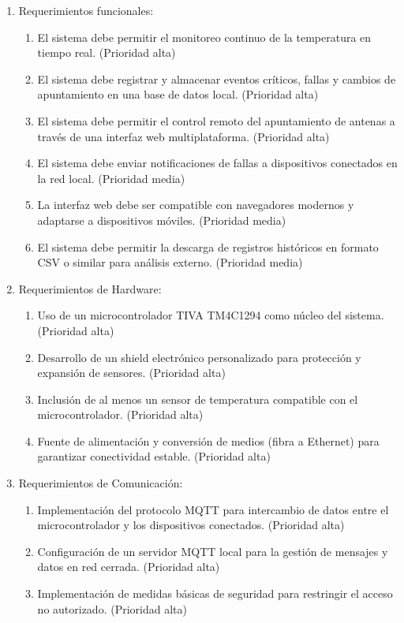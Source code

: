 \documentclass[
11pt, %
]{charter}
\begin{document}
\begin{enumerate}
	\item Requerimientos funcionales:
	\begin{enumerate}
		\item El sistema debe permitir el monitoreo continuo de la temperatura en tiempo real. (Prioridad alta)
		\item El sistema debe registrar y almacenar eventos críticos, fallas y cambios de apuntamiento en una base de datos local. (Prioridad alta)
		\item El sistema debe permitir el control remoto del apuntamiento de antenas a través de una interfaz web multiplataforma. (Prioridad alta)
		\item El sistema debe enviar notificaciones de fallas a dispositivos conectados en la red local. (Prioridad media)
		\item La interfaz web debe ser compatible con navegadores modernos y adaptarse a dispositivos móviles. (Prioridad media)
		\item El sistema debe permitir la descarga de registros históricos en formato CSV o similar para análisis externo. (Prioridad media)
	\end{enumerate}
	\item Requerimientos de Hardware:
	\begin{enumerate}
		\item Uso de un microcontrolador TIVA TM4C1294 como núcleo del sistema. (Prioridad alta)
		\item Desarrollo de un shield electrónico personalizado para protección y expansión de sensores. (Prioridad alta)
		\item Inclusión de al menos un sensor de temperatura compatible con el microcontrolador. (Prioridad alta)
		\item  Fuente de alimentación y conversión de medios (fibra a Ethernet) para garantizar conectividad estable. (Prioridad alta)
	\end{enumerate}
	\item Requerimientos de Comunicación:
	\begin{enumerate}
		\item Implementación del protocolo MQTT para intercambio de datos entre el microcontrolador y los dispositivos conectados. (Prioridad alta)
		\item Configuración de un servidor MQTT local para la gestión de mensajes y datos en red cerrada. (Prioridad alta)
		\item Implementación de medidas básicas de seguridad para restringir el acceso no autorizado. (Prioridad alta)

\end{enumerate}
\end{enumerate}
\end{document}
